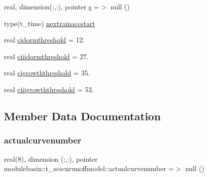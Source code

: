 \begin{DoxyCompactItemize}
real, dimension(\+:,\+:), pointer \mbox{\hyperlink{structmodulebasin_1_1t__scscnrunoffmodel_a3c58781c4ed73cb5a86f8a37be61d0cc}{s}} =$>$ null ()
\item 
type(t\+\_\+time) \mbox{\hyperlink{structmodulebasin_1_1t__scscnrunoffmodel_a25219c6269e19046a7cd10ff70b7b9b0}{nextrainaccstart}}
\item 
real \mbox{\hyperlink{structmodulebasin_1_1t__scscnrunoffmodel_a559190f844a5d5dbb6c3dcbea75dc314}{cidormthreshold}} = 12.
\item 
real \mbox{\hyperlink{structmodulebasin_1_1t__scscnrunoffmodel_a7dc9b0bcc92ceac580467b3756426766}{ciiidormthreshold}} = 27.
\item 
real \mbox{\hyperlink{structmodulebasin_1_1t__scscnrunoffmodel_a18cd47d6766c5bd92242699dc9860eb7}{cigrowththreshold}} = 35.
\item 
real \mbox{\hyperlink{structmodulebasin_1_1t__scscnrunoffmodel_a666203f3a94e70ee545099fa2ab5e765}{ciiigrowththreshold}} = 53.
\end{DoxyCompactItemize}


\subsection{Member Data Documentation}
\mbox{\label{structmodulebasin_1_1t__scscnrunoffmodel_a7f12a3b0673e016bf98f84d65cb8235a}} 
\subsubsection{\texorpdfstring{actualcurvenumber}{actualcurvenumber}}
{\footnotesize\ttfamily real(8), dimension (\+:,\+:), pointer modulebasin\+::t\+\_\+scscnrunoffmodel\+::actualcurvenumber =$>$ null ()\hspace{0.3cm}{\ttfamily [private]}}

\mbox{\label{structmodulebasin_1_1t__scscnrunoffmodel_a559190f844a5d5dbb6c3dcbea75dc314}} 
